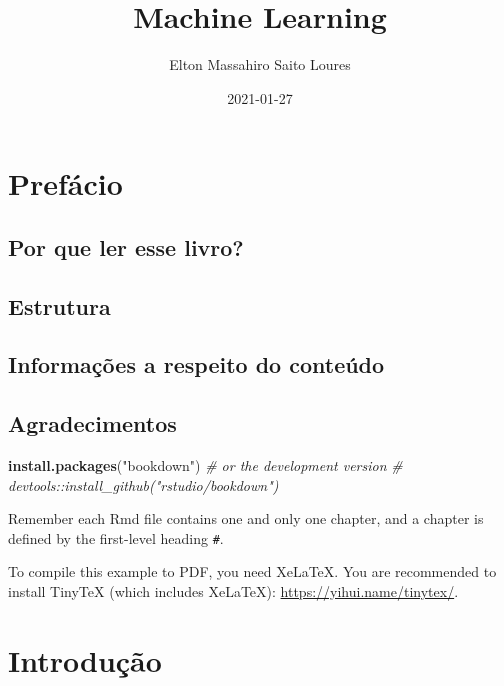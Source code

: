 \documentclass[
]{book}
\title{Machine Learning}
\author{Elton Massahiro Saito Loures}
\date{2021-01-27}
\newenvironment{Shaded}{\begin{snugshade}}{\end{snugshade}}
\newcommand{\CommentTok}[1]{\textcolor[rgb]{0.56,0.35,0.01}{\textit{#1}}}
\newcommand{\KeywordTok}[1]{\textcolor[rgb]{0.13,0.29,0.53}{\textbf{#1}}}
\newcommand{\NormalTok}[1]{#1}
\newcommand{\StringTok}[1]{\textcolor[rgb]{0.31,0.60,0.02}{#1}}
\begin{document}
\maketitle

{
\setcounter{tocdepth}{1}
\tableofcontents
}
\hypertarget{prefuxe1cio}{%
\chapter*{Prefácio}\label{prefuxe1cio}}

\hypertarget{por-que-ler-esse-livro}{%
\section{Por que ler esse livro?}\label{por-que-ler-esse-livro}}

\hypertarget{estrutura}{%
\section{Estrutura}\label{estrutura}}

\hypertarget{informauxe7uxf5es-a-respeito-do-conteuxfado}{%
\section{Informações a respeito do conteúdo}\label{informauxe7uxf5es-a-respeito-do-conteuxfado}}

\hypertarget{agradecimentos}{%
\section{Agradecimentos}\label{agradecimentos}}

\begin{Shaded}
\begin{Highlighting}[]
\KeywordTok{install.packages}\NormalTok{(}\StringTok{"bookdown"}\NormalTok{)}
\CommentTok{# or the development version}
\CommentTok{# devtools::install_github("rstudio/bookdown")}
\end{Highlighting}
\end{Shaded}

Remember each Rmd file contains one and only one chapter, and a chapter is defined by the first-level heading \texttt{\#}.

To compile this example to PDF, you need XeLaTeX. You are recommended to install TinyTeX (which includes XeLaTeX): \url{https://yihui.name/tinytex/}.

\hypertarget{intro}{%
\chapter{Introdução}\label{intro}}
\end{document}
